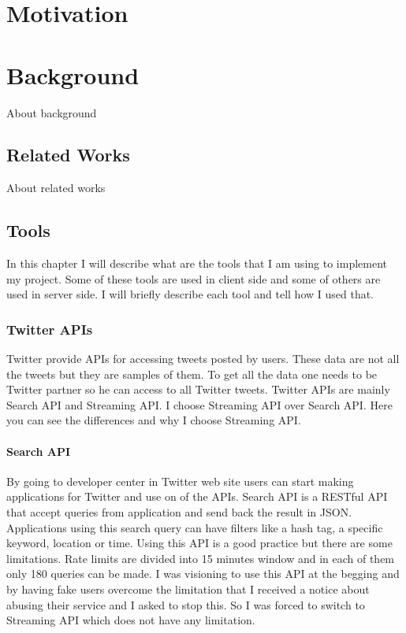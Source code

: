 \documentclass[a4paper,11pt]{report}
\begin{document}
\chapter{Motivation}

\chapter{Background}
About background

\section{Related Works}
About related works


\section{Tools}

In this chapter I will describe what are the tools that I am using to implement my project. Some of these tools are used in client side and some of others are used in server side. I will briefly describe each tool and tell how I used that.

\subsection{Twitter APIs}

Twitter provide APIs for accessing tweets posted by users. These data are not all the tweets but they are samples of them. To get all the data one needs to be Twitter partner so he can access to all Twitter tweets. Twitter APIs are mainly Search API and Streaming API. I choose Streaming API over Search API. Here you can see the differences and why I choose Streaming API.

\subsubsection{Search API}

By going to developer center in Twitter web site users can start making applications for Twitter and use on of the APIs. Search API is a RESTful API that accept queries from application and send back the result in JSON. Applications using this search query can have filters like a hash tag, a specific keyword, location or time. Using this API is a good practice but there are some limitations. Rate limits are divided into 15 minutes window and in each of them only 180 queries can be made. I was visioning to use this API at the begging and by having fake users overcome the limitation that I received a notice about abusing their service and I asked to stop this. So I was forced to switch to Streaming API which does not have any limitation. 
\end{document}
